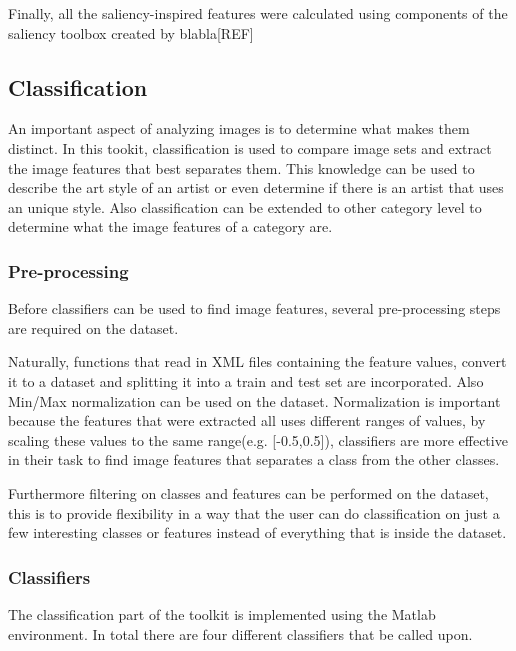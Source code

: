 Finally, all the saliency-inspired features were calculated using components of the saliency toolbox created by blabla[REF]

\subsection{Classification}
An important aspect of analyzing images is to determine what makes them distinct.
In this tookit, classification is used to compare image sets and extract the image features that best separates them.
This knowledge can be used to describe the art style of an artist or even determine if there is an artist that uses an unique style.
Also classification can be extended to other category level to determine what the image features of a category are.

\subsubsection{Pre-processing}
Before classifiers can be used to find image features, several pre-processing steps are required on the dataset.

Naturally, functions that read in XML files containing the feature values, convert it to a dataset and splitting it into a train and test set are incorporated.
Also Min/Max normalization can be used on the dataset.
Normalization is important because the features that were extracted all uses different ranges of values, by scaling these values to the same range(e.g. [-0.5,0.5]), classifiers are more effective in their task to find image features that separates a class from the other classes.

Furthermore filtering on classes and features can be performed on the dataset, this is to provide flexibility in a way that the user can do classification on just a few interesting classes or features instead of everything that is inside the dataset.

\subsubsection{Classifiers}
The classification part of the toolkit is implemented using the Matlab environment. In total there are four different classifiers that be called upon.

